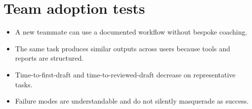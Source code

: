 \section{Team adoption tests}

\begin{itemize}
  \item A new teammate can use a documented workflow without bespoke coaching.
  \item The same task produces similar outputs across users because tools and reports are structured.
  \item Time-to-first-draft and time-to-reviewed-draft decrease on representative tasks.
  \item Failure modes are understandable and do not silently masquerade as success.
\end{itemize}
